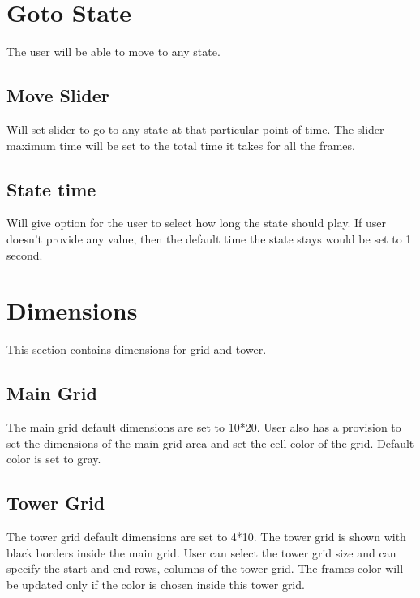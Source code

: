 \documentclass[12pt,a4paper]{article}
\begin{document}
\section{Goto State}
The user will be able to move to any state.
\subsection{Move Slider}
Will set slider to go to any state at that particular point of time. The slider maximum time will be set to the total time it takes for all the frames.
\subsection{State time}
Will give option for the user to select how long the state should play. If user doesn’t provide any value, then the default time the state stays would be set to 1 second.
\section{Dimensions}
This section contains dimensions for grid and tower.
\subsection{Main Grid}
The main grid default dimensions are set to 10*20. User also has a provision to set the dimensions of the main grid area and set the cell color of the grid. Default color is set to gray.
\subsection{Tower Grid}
The tower grid default dimensions are set to 4*10. The tower grid is shown with black borders inside the main grid. User can select the tower grid size and can specify the start and end rows, columns of the tower grid. The frames color will be updated only if the color is chosen inside this tower grid.
\end{document}
